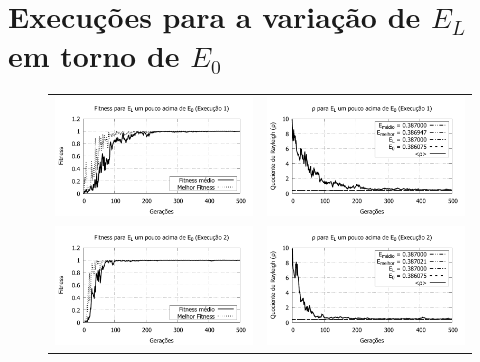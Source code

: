 \chapter{Execuções para a variação de $E_L$ em torno de $E_0$}

\begin{figure}[htbp]
	\centering
  \begin{tabular}{@{}cc@{}}
    
		\includegraphics[width=.49\textwidth]{figs/resultados/variandoEL/T1E1_fitness.pdf} &
    \includegraphics[width=.49\textwidth]{figs/resultados/variandoEL/T1E1_rho.pdf}   \\
		
		\includegraphics[width=.49\textwidth]{figs/resultados/variandoEL/T1E2_fitness.pdf} &
    \includegraphics[width=.49\textwidth]{figs/resultados/variandoEL/T1E2_rho.pdf}   \\
		

\end{tabular}
\end{figure}
